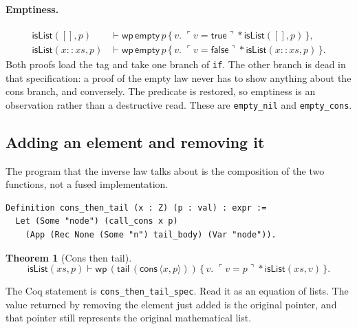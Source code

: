 \documentclass[11pt]{article}
\newtheorem{theorem}{Theorem}
\newcommand{\True}{\mathsf{true}}
\newcommand{\False}{\mathsf{false}}
\newcommand{\sep}{\mathbin{*}}
\newcommand{\Wpre}{\mathsf{wp}}
\newcommand{\pure}[1]{\ulcorner #1 \urcorner}
\begin{document}
\paragraph{Emptiness.}
\[
\begin{aligned}
\mathsf{isList}([], p)
  &\vdash
  \Wpre\,\mathsf{empty}\,p
  \,\{\,v.\; \pure{v = \True} \sep \mathsf{isList}([], p)\,\},\\
\mathsf{isList}(x :: xs, p)
  &\vdash
  \Wpre\,\mathsf{empty}\,p
  \,\{\,v.\; \pure{v = \False} \sep \mathsf{isList}(x :: xs, p)\,\}.
\end{aligned}
\]
Both proofs load the tag and take one branch of \texttt{if}.
The other branch is dead in that specification: a proof of the empty law never has to show anything about the cons branch, and conversely.
The predicate is restored, so emptiness is an observation rather than a destructive read.
These are \texttt{empty\_nil} and \texttt{empty\_cons}.

\subsection{Adding an element and removing it}

The program that the inverse law talks about is the composition of the two functions, not a fused implementation.

\begin{lstlisting}
Definition cons_then_tail (x : Z) (p : val) : expr :=
  Let (Some "node") (call_cons x p)
    (App (Rec None (Some "n") tail_body) (Var "node")).
\end{lstlisting}

\begin{theorem}[Cons then tail]
\[
\mathsf{isList}(xs, p)
\vdash
\Wpre\,(\mathsf{tail}\,(\mathsf{cons}\,\langle x, p\rangle))
\,\{\,v.\; \pure{v = p} \sep \mathsf{isList}(xs, v)\,\}.
\]
\end{theorem}

The Coq statement is \texttt{cons\_then\_tail\_spec}.
Read it as an equation of lists.
The value returned by removing the element just added is the original pointer, and that pointer still represents the original mathematical list.
\end{document}
